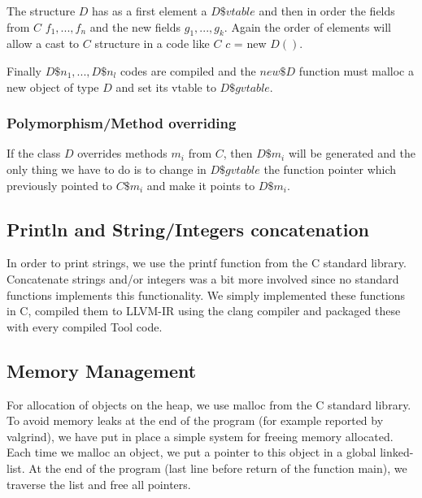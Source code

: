 The structure $D$ has as a first element a $D\$vtable$ and then in order the fields from $C$ $f_1, ..., f_n$ and the new fields $g_1, ..., g_k$. Again the order of elements will allow a cast to $C$ structure in a code like $C$ $c$ = new $D()$.

Finally $D\$n_1, ..., D\$n_l$ codes are compiled and the $new\$D$ function must malloc a new object of type $D$ and set its vtable to $D\$gvtable$.

\subsubsection{Polymorphism/Method overriding}
If the class $D$ overrides methods $m_i$ from $C$, then $D\$m_i$ will be generated and the only thing we have to do is to change in $D\$gvtable$ the function pointer which previously pointed to $C\$m_i$ and make it points to $D\$m_i$.

\subsection{Println and String/Integers concatenation}
In order to print strings, we use the printf function from the C standard library. Concatenate strings and/or integers was a bit more involved since no standard functions implements this functionality. We simply implemented these functions in C, compiled them to LLVM-IR using the clang compiler and packaged these with every compiled Tool code.

\subsection{Memory Management}
For allocation of objects on the heap, we use malloc from the C standard library.
To avoid memory leaks at the end of the program (for example reported by valgrind), we have put in place a simple system for freeing memory allocated. Each time we malloc an object, we put a pointer to this object in a global linked-list. At the end of the program (last line before return of the function main), we traverse the list and free all pointers.


